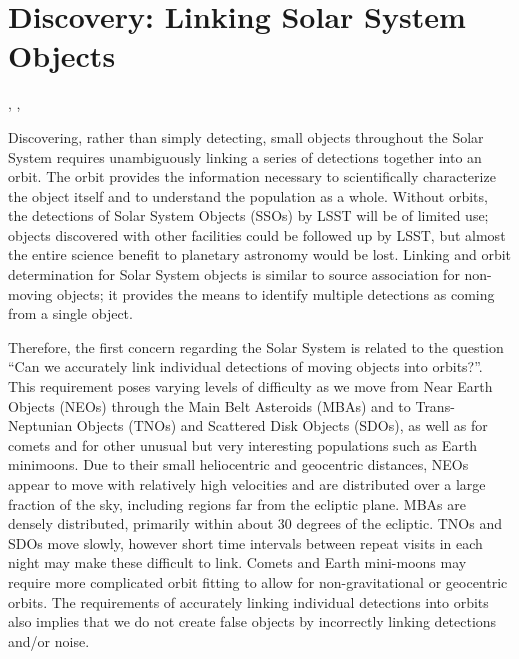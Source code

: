 %
%
%

\section{Discovery: Linking Solar System Objects}
\def\secname{\chpname:discovery}\label{sec:\secname}

,
,

Discovering, rather than simply detecting, small objects throughout
the Solar System requires unambiguously linking a series of detections
together into an orbit. The orbit provides the information necessary
to scientifically characterize the object itself and to understand the
population as a whole. Without orbits, the detections of Solar System
Objects (SSOs) by LSST will be of limited use; objects discovered with
other facilities could be followed up by LSST, but almost the entire
science benefit to planetary astronomy would be lost. Linking and
orbit determination for Solar System objects is similar to source
association for non-moving objects; it provides the means to identify
multiple detections as coming from a single object.

Therefore, the first concern regarding the Solar System is related
to the question ``Can we accurately link individual detections of moving objects into
orbits?''.  This requirement poses varying levels of difficulty as we
move from Near Earth Objects (NEOs) through the Main Belt Asteroids
(MBAs) and to Trans-Neptunian Objects (TNOs) and Scattered Disk Objects
(SDOs), as well as for comets and for other unusual but very
interesting populations such as Earth minimoons. Due to their small
heliocentric and geocentric distances, NEOs appear to move with
relatively high velocities and are distributed over a large fraction
of the sky, including regions far from the ecliptic plane. MBAs are densely distributed,
primarily within about 30 degrees of the ecliptic. TNOs and SDOs move
slowly, however short time intervals between repeat visits in each night may make these difficult
to link. Comets and Earth mini-moons may require more complicated
orbit fitting to allow for non-gravitational or geocentric
orbits. The requirements of accurately linking individual detections
into orbits also implies that we do not create false objects by
incorrectly linking detections and/or noise.

